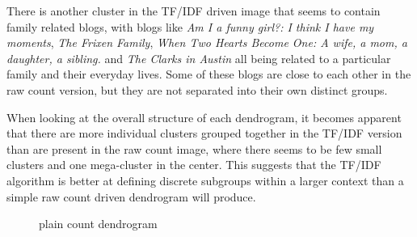 There is another cluster in the TF/IDF driven image that seems to contain family related blogs, with blogs like {\it Am I a funny girl?: I think I have my moments}, {\it The Frixen Family}, {\it When Two Hearts Become One: A wife, a mom, a daughter, a sibling.} and {\it The Clarks in Austin} all being related to a particular family and their everyday lives. Some of these blogs are close to each other in the raw count version, but they are not separated into their own distinct groups.

When looking at the overall structure of each dendrogram, it becomes apparent that there are more individual clusters grouped together in the TF/IDF version than are present in the raw count image, where there seems to be few small clusters and one mega-cluster in the center. This suggests that the TF/IDF algorithm is better at defining discrete subgroups within a larger context than a simple raw count driven dendrogram will produce.

\begin{figure}[h!]
\centering
{}
\caption{plain count dendrogram}
\label{fig:plain}
\end{figure}

